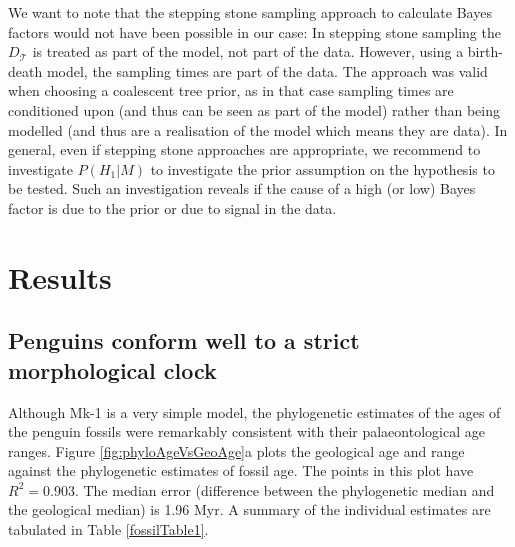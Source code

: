 \documentclass[11pt]{article}
\newcommand{\Mstrict}{{Mk-1}}
\begin{document}
We want to note that the stepping stone sampling approach \cite{Xie2011}
 to calculate Bayes factors would not have been possible in our case:  In stepping stone sampling the $D_\mathcal{T}$ is treated as part of the model, not part of the data. However, using a birth-death model, the sampling times are part of the data. The approach was valid when choosing a  coalescent tree prior, as in that case sampling times are conditioned upon (and thus can be seen as part of the model) rather than being modelled (and thus are a realisation of the model which means they are data).
In general, even if stepping stone approaches are appropriate, we recommend to investigate $P(H_1|M)$ to investigate the prior assumption on the hypothesis to be tested. Such an investigation reveals if the cause of a high (or low) Bayes factor is due to the prior or due to signal in the data.

\section*{Results}

\subsection*{Penguins conform well to a strict morphological clock}
Although \Mstrict{} is a very simple model, the phylogenetic estimates of the ages of the penguin fossils were remarkably consistent with their palaeontological age ranges. 
Figure \ref{fig:phyloAgeVsGeoAge}a plots the geological age and range against the phylogenetic estimates of fossil age. The points in this plot have $R^2 = 0.903$. 
The median error (difference between the phylogenetic median and the geological median) is 1.96 Myr. A summary of the individual estimates are tabulated in Table \ref{fossilTable1}.
\end{document}

